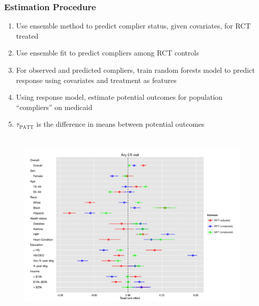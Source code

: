\documentclass{beamer}
\begin{document}
\begin{frame} 
\frametitle{Estimation Procedure}
\begin{enumerate}
\item Use ensemble method to predict complier status, given covariates, for RCT treated
\item Use ensemble fit to predict compliers among RCT controls 
\item For observed and predicted compliers, train random forests model to predict response using covariates and treatment as features
\item Using response model, estimate potential outcomes for population ``compliers'' on medicaid
\item $\tau_{\text{PATT}}$ is the difference in means between potential outcomes
\end{enumerate}
\end{frame}


\section[Results]{}

\begin{frame}
\begin{figure}[htbp]
\begin{center}
   \includegraphics[scale=0.4]{../paper/any-visit-plot-horz.pdf} 
   \label{het-plot-av}
   \end{center}
\end{figure}
\end{frame}
\end{document}
